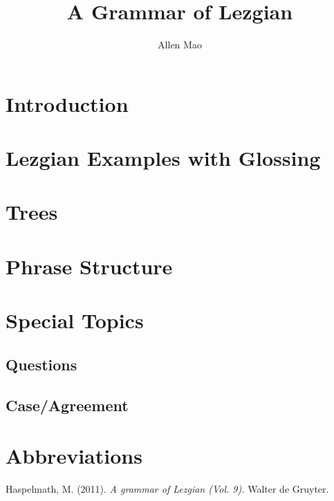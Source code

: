 \documentclass[12pt, letterpaper]{article}
\title{A Grammar of Lezgian}
\author{Allen Mao}
\begin{document}
\maketitle
\section{Introduction}

\section*{Lezgian Examples with Glossing}

\section*{Trees}
\label{sec:trees}

\section{Phrase Structure}

\section{Special Topics}
\label{sec:spec-topics}
\subsection{Questions}

\subsection{Case/Agreement}

\section{Abbreviations}
\printglossaries
\begin{thebibliography}{}
Haspelmath, M. (2011). \textit{A grammar of Lezgian (Vol. 9).} Walter de Gruyter.

\end{thebibliography}
\end{document}

